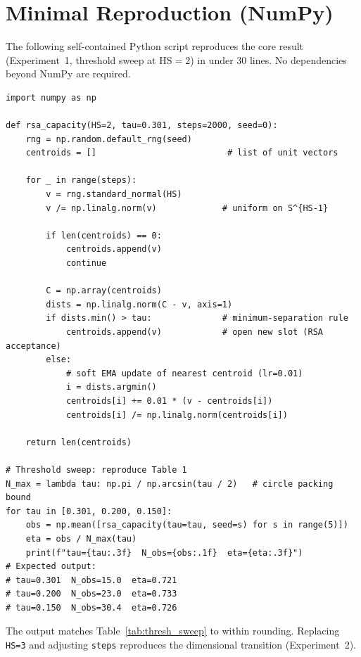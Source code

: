 \documentclass[11pt]{article}
\begin{document}
\appendix
\section{Minimal Reproduction (NumPy)}
\label{sec:code}

The following self-contained Python script reproduces the core result
(Experiment~1, threshold sweep at $\mathrm{HS}=2$) in under 30 lines.
No dependencies beyond NumPy are required.

\begin{verbatim}
import numpy as np

def rsa_capacity(HS=2, tau=0.301, steps=2000, seed=0):
    rng = np.random.default_rng(seed)
    centroids = []                          # list of unit vectors

    for _ in range(steps):
        v = rng.standard_normal(HS)
        v /= np.linalg.norm(v)             # uniform on S^{HS-1}

        if len(centroids) == 0:
            centroids.append(v)
            continue

        C = np.array(centroids)
        dists = np.linalg.norm(C - v, axis=1)
        if dists.min() > tau:              # minimum-separation rule
            centroids.append(v)            # open new slot (RSA acceptance)
        else:
            # soft EMA update of nearest centroid (lr=0.01)
            i = dists.argmin()
            centroids[i] += 0.01 * (v - centroids[i])
            centroids[i] /= np.linalg.norm(centroids[i])

    return len(centroids)

# Threshold sweep: reproduce Table 1
N_max = lambda tau: np.pi / np.arcsin(tau / 2)   # circle packing bound
for tau in [0.301, 0.200, 0.150]:
    obs = np.mean([rsa_capacity(tau=tau, seed=s) for s in range(5)])
    eta = obs / N_max(tau)
    print(f"tau={tau:.3f}  N_obs={obs:.1f}  eta={eta:.3f}")
# Expected output:
# tau=0.301  N_obs=15.0  eta=0.721
# tau=0.200  N_obs=23.0  eta=0.733
# tau=0.150  N_obs=30.4  eta=0.726
\end{verbatim}

The output matches Table~\ref{tab:thresh_sweep} to within rounding.
Replacing \texttt{HS=3} and adjusting \texttt{steps} reproduces the
dimensional transition (Experiment~2).
\end{document}
